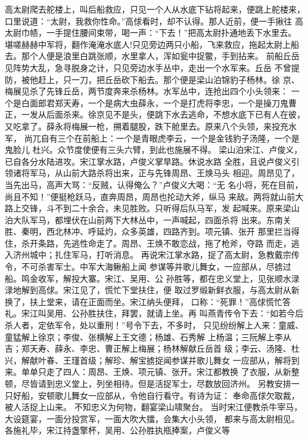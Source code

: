 高太尉爬去舵楼上，叫后船救应，只见一个人从水底下钻将起来，便跳上舵楼来，
口里说道：“太尉，我救你性命。”高俅看时，却不认得。那人近前，便一手揪往
高太尉巾帻，一手提住腰间束带，喝一声：“下去！”把高太尉扑通地丢下水里去。
堪嗟赫赫中军将，翻作淹淹水底人!只见旁边两只小船，飞来救应，拖起太尉上船
去。那个人便是浪里白跳张顺，水里拿人，浑如瓮中捉鳖，手到拈来。
前船丘岳见阵势大乱，急寻脱身之计，只见旁边水手丛中，走出一个水军来。丘岳
不曾提防，被他赶上，只一刀，把丘岳砍下船去。那个便是梁山泊锦豹子杨林。徐
京、梅展见杀了先锋丘岳，两节度奔来杀杨林。水军丛中，连抢出四个小头领来：
一个是白面郎君郑天寿，一个是病大虫薛永，一个是打虎将李忠，一个是操刀鬼曹
正，一发从后面杀来。徐京见不是头，便跳下水去逃命，不想水底下已有人在彼，
又吃拿了。薛永将梅展一枪，搠着腿股，跌下舱里去。原来八个头领，来投充水军，
尚兀自有三个在前船上：一个是青眼虎李云，一个是金钱豹子汤隆，一个是鬼脸儿
杜兴。众节度使便有三头六臂，到此也施展不得。
梁山泊宋江、卢俊义，已自各分水陆进攻。宋江掌水路，卢俊义掌旱路。休说水路
全胜，且说卢俊义引领诸将军马，从山前大路杀将出来，正与先锋周昂、王焕马头
相迎。周昂见了，当先出马，高声大骂：“反贼，认得俺么？”卢俊义大喝：“无
名小将，死在目前，尚且不知！”便挺枪跃马，直奔周昂，周昂也抡动大斧，纵马
来敌。两将就山前大路上交锋，斗不到二十余合，未见胜败。只听得后队马军，发
起喊来。原来梁山泊大队军马，都埋伏在山前两下大林丛中，一声喊起，四面杀将
出来。东南关胜、秦明，西北林冲、呼延灼，众多英雄，四路齐到。项元镇、张开
那里拦当得住，杀开条路，先逃性命走了。周昂、王焕不敢恋战，拖了枪斧，夺路
而走，逃入济州城中；扎住军马，打听消息。
再说宋江掌水路，捉了高太尉，急教戴宗传令，不可杀害军士。中军大海鳅船上闻
参谋等并歌儿舞女，一应部从，尽掳过船。鸣金收军，解投大寨。宋江、吴用、公
孙胜等，都在忠义堂上，见张顺水渌渌地解到高俅。宋江见了，慌忙下堂扶住，便
取过罗缎新鲜衣服，与高太尉从新换了，扶上堂来，请在正面而坐。宋江纳头便拜，
口称：“死罪！”高俅慌忙答礼。宋江叫吴用、公孙胜扶住，拜罢，就请上坐。再
叫燕青传令下去：“如若今后杀人者，定依军令，处以重刑！”号令下去，不多时，
只见纷纷解上人来：童威、童猛解上徐京；李俊、张横解上王文德；杨雄、石秀解
上杨温；三阮解上李从吉；郑天寿、薛永、李忠、曹正解上梅展；杨林解献丘岳首
级；李云、汤隆、杜兴，解献叶春、王瑾首级；解珍、解宝掳捉闻参谋并歌儿舞女
一应部从，解将到来。单单只走了四人：周昂、王焕、项元镇、张开。宋江都教换
了衣服，从新整顿，尽皆请到忠义堂上，列坐相待。但是活捉军士，尽数放回济州。
另教安排一只好船，安顿歌儿舞女一应部从，令他自行看守。有诗为证：
奉命高俅欠取裁，被人活捉上山来。
不知忠义为何物，翻宴梁山啸聚台。
当时宋江便教杀牛宰马，大设筵宴，一面分投赏军，一面大吹大擂，会集大小头领，
都来与高太尉相见。各施礼毕，宋江持盏擎杯，吴用、公孙胜执瓶捧案，卢俊义等
